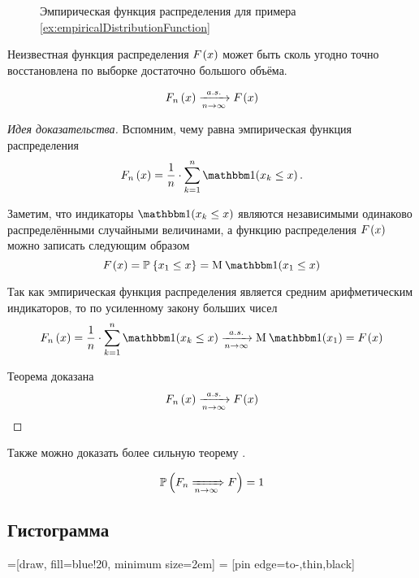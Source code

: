 \begin{figure}
  \center
  \caption{Эмпирическая функция распределения для примера
    \ref{ex:empiricalDistributionFunction}}
  \label{fig:tikz:empiricalDistributionFunction}
\end{figure}

Неизвестная функция распределения $F_{}\left(x\right)$ может быть сколь угодно
точно восстановлена по выборке достаточно большого объёма.

\begin{theorem}\label{theorem:distributionFunction:empiricalToCumulative}
  $$F_n\left(x\right) \xrightarrow[n\to\infty]{a.s.} F_{}\left(x\right)$$
\end{theorem}
\begin{proof}[Идея доказательства]
Вспомним, чему равна эмпирическая функция распределения
$$\cdfn{x}=\frac{1}{n}\cdot \sum_{k=1}^n
\indicator{x_k\le x}.$$

Заметим, что индикаторы $\indicator{x_k\le x}$
являются независимыми одинаково распределёнными случайными величинами,
а функцию распределения $F_{}\left(x\right)$ можно записать следующим образом
$$\cdf{x}=\Probability{x_1\le x}=\mean{\indicator{x_1\le x}}$$

Так как эмпирическая функция распределения является
средним арифметическим индикаторов, то по усиленному закону больших чисел
$$\cdfn{x}=\frac{1}{n}\cdot\sum_{k=1}^n\indicator{x_k\le x}
\acovergence\mean{\indicator{x_1}}=\cdf{x}$$

Теорема доказана
$$F_n\left(x\right) \xrightarrow[n\to\infty]{a.s.} F_{}\left(x\right)$$
\end{proof}

Также можно доказать более сильную теорему \cite{IvchenkoMA}.

\begin{theorem}
  \label{theorem:convergenceFProbability}
  \begin{equation*}
    \mathbb{P}\left( F_n \xRightarrow[n\to\infty]{} F \right) = 1
  \end{equation*}
\end{theorem}

\subsection{Гистограмма}
\label{subsection:histogram}
=[draw, fill=blue!20, minimum size=2em]
 = [pin edge={to-,thin,black}]

